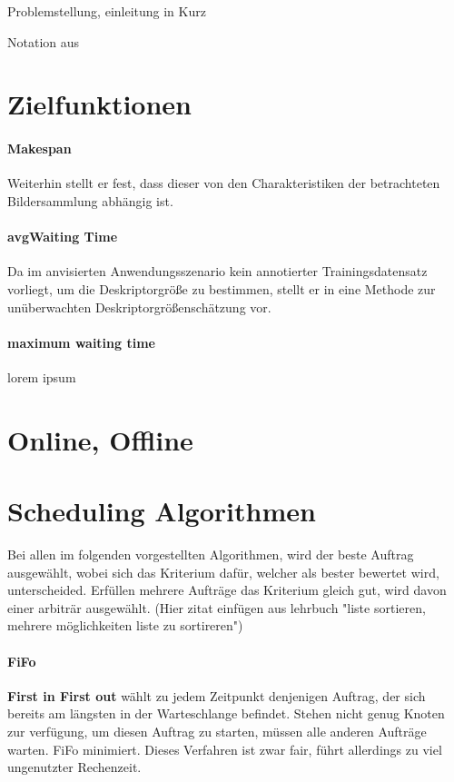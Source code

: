 Problemstellung, einleitung in Kurz

Notation aus

\section{Zielfunktionen}

\paragraph{Makespan}

Weiterhin stellt er fest, dass dieser von den Charakteristiken der betrachteten Bildersammlung abhängig ist. 
\paragraph{avgWaiting Time}
Da im anvisierten Anwendungsszenario kein annotierter Trainingsdatensatz vorliegt, um die Deskriptorgröße zu bestimmen, 
stellt er in \cite[Kap. 5.4.1]{LDiss} eine Methode zur unüberwachten Deskriptorgrößenschätzung vor.

\paragraph{maximum waiting time}
lorem ipsum

\section{Online, Offline}

\section{Scheduling Algorithmen}
Bei allen im folgenden vorgestellten Algorithmen, wird der beste Auftrag ausgewählt, wobei sich das Kriterium dafür, welcher als bester bewertet wird, unterscheided. Erfüllen mehrere Aufträge das Kriterium gleich gut, wird davon einer arbiträr ausgewählt. (Hier zitat einfügen aus lehrbuch "liste sortieren, mehrere möglichkeiten liste zu sortireren")

\paragraph{FiFo}
\textbf{First in First out} wählt zu jedem Zeitpunkt denjenigen Auftrag, der sich bereits am längsten in der Warteschlange befindet. Stehen nicht genug Knoten zur verfügung, um diesen Auftrag zu starten, müssen alle anderen Aufträge warten. FiFo minimiert. Dieses Verfahren ist zwar fair, führt allerdings zu viel ungenutzter Rechenzeit.

